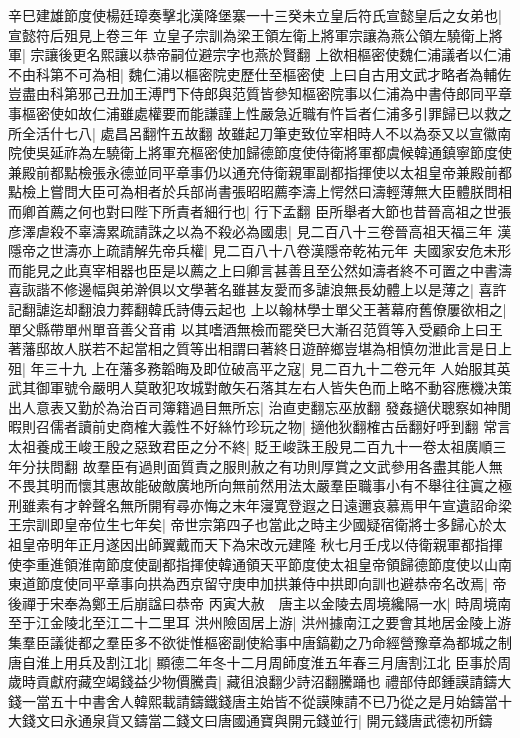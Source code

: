 辛巳建雄節度使楊廷璋奏擊北漢降堡寨一十三癸未立皇后符氏宣懿皇后之女弟也|{
	宣懿符后殂見上卷三年}
立皇子宗訓為梁王領左衛上將軍宗讓為燕公領左驍衛上將軍|{
	宗讓後更名熙讓以恭帝嗣位避宗字也燕於賢翻}
上欲相樞密使魏仁浦議者以仁浦不由科第不可為相|{
	魏仁浦以樞密院吏歷仕至樞密使}
上曰自古用文武才略者為輔佐豈盡由科第邪己丑加王溥門下侍郎與范質皆參知樞密院事以仁浦為中書侍郎同平章事樞密使如故仁浦雖處權要而能謙謹上性嚴急近職有忤旨者仁浦多引罪歸已以救之所全活什七八|{
	處昌呂翻忤五故翻}
故雖起刀筆吏致位宰相時人不以為沗又以宣徽南院使吳延祚為左驍衛上將軍充樞密使加歸德節度使侍衛將軍都虞候韓通鎮寧節度使兼殿前都點檢張永德並同平章事仍以通充侍衛親軍副都指揮使以太祖皇帝兼殿前都點檢上嘗問大臣可為相者於兵部尚書張昭昭薦李濤上愕然曰濤輕薄無大臣體朕問相而卿首薦之何也對曰陛下所責者細行也|{
	行下孟翻}
臣所舉者大節也昔晉高祖之世張彦澤虐殺不辜濤累疏請誅之以為不殺必為國患|{
	見二百八十三卷晉高祖天福三年}
漢隱帝之世濤亦上疏請解先帝兵權|{
	見二百八十八卷漢隱帝乾祐元年}
夫國家安危未形而能見之此真宰相器也臣是以薦之上曰卿言甚善且至公然如濤者終不可置之中書濤喜詼諧不修邊幅與弟澣俱以文學著名雖甚友愛而多謔浪無長幼體上以是薄之|{
	喜許記翻謔迄却翻浪力葬翻韓氏詩傳云起也}
上以翰林學士單父王著幕府舊僚屢欲相之|{
	單父縣帶單州單音善父音甫}
以其嗜酒無檢而罷癸巳大漸召范質等入受顧命上曰王著藩邸故人朕若不起當相之質等出相謂曰著終日遊醉鄉豈堪為相慎勿泄此言是日上殂|{
	年三十九}
上在藩多務韜晦及即位破高平之寇|{
	見二百九十二卷元年}
人始服其英武其御軍號令嚴明人莫敢犯攻城對敵矢石落其左右人皆失色而上略不動容應機决策出人意表又勤於為治百司簿籍過目無所忘|{
	治直吏翻忘巫放翻}
發姦擿伏聰察如神閒暇則召儒者讀前史商榷大義性不好絲竹珍玩之物|{
	擿他狄翻榷古岳翻好呼到翻}
常言太祖養成王峻王殷之惡致君臣之分不終|{
	貶王峻誅王殷見二百九十一卷太祖廣順三年分扶問翻}
故羣臣有過則面質責之服則赦之有功則厚賞之文武參用各盡其能人無不畏其明而懷其惠故能破敵廣地所向無前然用法太嚴羣臣職事小有不舉往往寘之極刑雖素有才幹聲名無所開宥尋亦悔之末年寖寛登遐之日遠邇哀慕焉甲午宣遺詔命梁王宗訓即皇帝位生七年矣|{
	帝世宗第四子也當此之時主少國疑宿衛將士多歸心於太祖皇帝明年正月遂因出師翼戴而天下為宋改元建隆}
秋七月壬戌以侍衛親軍都指揮使李重進領淮南節度使副都指揮使韓通領天平節度使太祖皇帝領歸德節度使以山南東道節度使同平章事向拱為西京留守庚申加拱兼侍中拱即向訓也避恭帝名改焉|{
	帝後禪于宋奉為鄭王后崩諡曰恭帝}
丙寅大赦　唐主以金陵去周境纔隔一水|{
	時周境南至于江金陵北至江二十二里耳}
洪州險固居上游|{
	洪州據南江之要會其地居金陵上游}
集羣臣議徙都之羣臣多不欲徙惟樞密副使給事中唐鎬勸之乃命經營豫章為都城之制唐自淮上用兵及割江北|{
	顯德二年冬十二月周師度淮五年春三月唐割江北}
臣事於周歲時貢獻府藏空竭錢益少物價騰貴|{
	藏徂浪翻少詩沼翻騰踊也}
禮部侍郎鍾謨請鑄大錢一當五十中書舍人韓熙載請鑄鐵錢唐主始皆不從謨陳請不已乃從之是月始鑄當十大錢文曰永通泉貨又鑄當二錢文曰唐國通寶與開元錢並行|{
	開元錢唐武德初所鑄}
